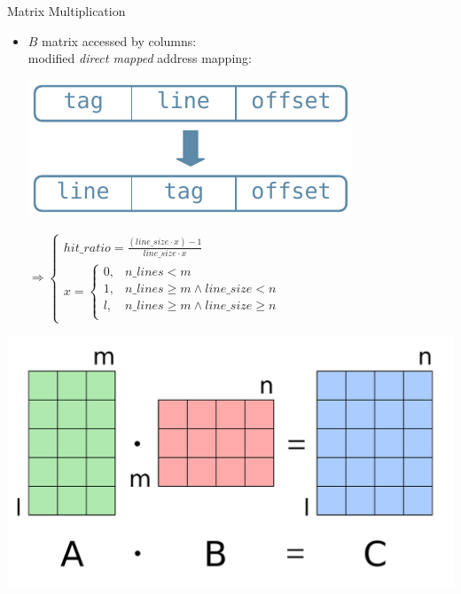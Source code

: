 \documentclass[handout,aspectratio=169]{beamer}
\begin{document}
\begin{frame}{Matrix Multiplication}
	\begin{minipage}{.77\textwidth}
		\begin{itemize}
			\item $B$ matrix accessed by columns:\\
				modified \emph{direct mapped}
				address mapping:

				\begin{center}
					\includegraphics[width=.3\textwidth]{mmul_addr.pdf}
				\end{center}

				\bigskip
				$\Rightarrow \begin{cases}
					hit\_ratio = \frac{(line\_size \cdot x) - 1}{line\_size \cdot x} \\
				x = \begin{cases}
					0, & n\_lines < m \\
					1, & n\_lines \geq m \wedge line\_size < n \\
					l, & n\_lines \geq m \wedge line\_size \geq n \\
				\end{cases}
				\end{cases}$
		\end{itemize}
	\end{minipage}
	\begin{minipage}{.22\textwidth}
		\begin{center}
			\includegraphics[width=.9\textwidth]{matmul.png}
		\end{center}
	\end{minipage}
\end{frame}
\end{document}
